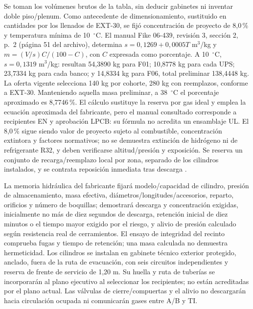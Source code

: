 Se toman los volúmenes brutos de la tabla, sin deducir gabinetes ni inventar doble piso/plenum. Como antecedente de dimensionamiento, sustituido en cantidades por los llenados de EXT-30, se fijó concentración de proyecto de 8,0\,\% y temperatura mínima de 10~$^\circ$C. El manual Fike 06-439, revisión 3, sección 2, p.~2 (página 51 del archivo), determina $s=0,1269+0,0005T$ m$^3$/kg y $m=(V/s)C/(100-C)$, con $C$ expresada como porcentaje. A 10~$^\circ$C, $s=0,1319$ m$^3$/kg: resultan 54,3890 kg para F01; 10,8778 kg para cada UPS; 23,7334 kg para cada banco; y 14,8334 kg para F06, total preliminar 138,4448 kg. La oferta vigente selecciona 140 kg por cohorte, 280 kg con reemplazos, conforme a EXT-30. Manteniendo aquella masa preliminar, a 38~$^\circ$C el porcentaje aproximado es 8,7746\,\%. El cálculo sustituye la reserva por gas ideal y emplea la ecuación aproximada del fabricante, pero el manual consultado corresponde a recipientes EN y aprobación LPCB: su fórmula no acredita un ensamblaje UL. El 8,0\,\% sigue siendo valor de proyecto sujeto al combustible, concentración extintora y factores normativos; no se demuestra extinción de hidrógeno ni de refrigerante R32, y deben verificarse altitud/presión y exposición. Se reserva un conjunto de recarga/reemplazo local por zona, separado de los cilindros instalados, y se contrata reposición inmediata tras descarga \parencite[sec.~2, p.~2]{l21-fike-manual}.

La memoria hidráulica del fabricante fijará modelo/capacidad de cilindro, presión de almacenamiento, masa efectiva, diámetros/longitudes/accesorios, reparto, orificios y número de boquillas; demostrará descarga y concentración exigidas, inicialmente no más de diez segundos de descarga, retención inicial de diez minutos o el tiempo mayor exigido por el riesgo, y alivio de presión calculado según resistencia real de cerramientos. El ensayo de integridad del recinto comprueba fugas y tiempo de retención; una masa calculada no demuestra hermeticidad. Los cilindros se instalan en gabinete técnico exterior protegido, anclado, fuera de la ruta de evacuación, con seis circuitos independientes y reserva de frente de servicio de 1,20 m. Su huella y ruta de tuberías se incorporarán al plano ejecutivo al seleccionar los recipientes; no están acreditadas por el plano actual. Las válvulas de cierre/compuertas y el alivio no descargarán hacia circulación ocupada ni comunicarán gases entre A/B y TI.

